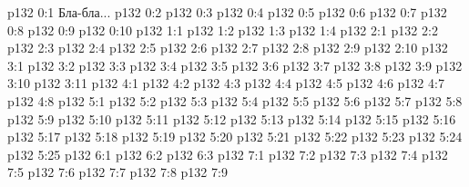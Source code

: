 \author{Промежуточные создания}
\vs p132 0:1  Бла-бла...
\vs p132 0:2 \pc 
\vs p132 0:3 \pc 
\vs p132 0:4 
\vs p132 0:5 
\vs p132 0:6 
\vs p132 0:7 
\vs p132 0:8 
\vs p132 0:9 \pc 
\vs p132 0:10 
\vs p132 1:1 
\vs p132 1:2 \pc 
\vs p132 1:3 
\vs p132 1:4 
\vs p132 2:1 
\vs p132 2:2 \pc 
\vs p132 2:3 
\vs p132 2:4 
\vs p132 2:5 
\vs p132 2:6 \pc 
\vs p132 2:7 
\vs p132 2:8 \pc 
\vs p132 2:9 
\vs p132 2:10 
\vs p132 3:1 
\vs p132 3:2 \pc 
\vs p132 3:3 
\vs p132 3:4 
\vs p132 3:5 
\vs p132 3:6 
\vs p132 3:7 
\vs p132 3:8 \pc 
\vs p132 3:9 
\vs p132 3:10 
\vs p132 3:11 \pc 
{}
\vs p132 4:1 
\vs p132 4:2 
\vs p132 4:3 
\vs p132 4:4 
\vs p132 4:5 \pc 
\vs p132 4:6 \pc 
\vs p132 4:7 \pc 
\vs p132 4:8 \pc 
{}
\vs p132 5:1 
\vs p132 5:2 
\vs p132 5:3 
\vs p132 5:4 
\vs p132 5:5 
\vs p132 5:6 
\vs p132 5:7 
\vs p132 5:8 
\vs p132 5:9 
\vs p132 5:10 
\vs p132 5:11 
\vs p132 5:12 
\vs p132 5:13 \pc 
\vs p132 5:14 
\vs p132 5:15 \pc 
\vs p132 5:16 \pc 
\vs p132 5:17 \pc 
\vs p132 5:18 \pc 
\vs p132 5:19 \pc 
\vs p132 5:20 \pc 
\vs p132 5:21 \pc 
\vs p132 5:22 \pc 
\vs p132 5:23 \pc 
\vs p132 5:24 \pc 
\vs p132 5:25 \pc 
{}
\vs p132 6:1 
\vs p132 6:2 \pc 
\vs p132 6:3 \pc 
{}
\vs p132 7:1 
\vs p132 7:2 \pc 
\vs p132 7:3 \pc 
\vs p132 7:4 
\vs p132 7:5 
\vs p132 7:6 
\vs p132 7:7 \pc 
\vs p132 7:8 
\vs p132 7:9 \pc 
\quizlink
